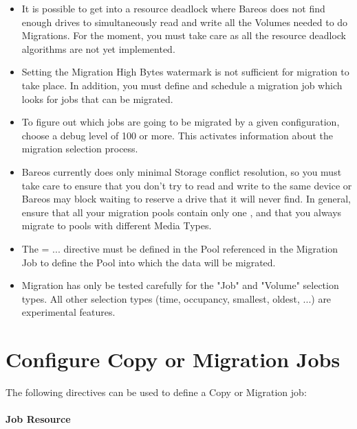 \begin{itemize}
\item It is possible to get into a resource deadlock where Bareos does
      not find enough drives to simultaneously read and write all the
      Volumes needed to do Migrations. For the moment, you must take
      care as all the resource deadlock algorithms are not yet implemented.

\item Setting the Migration High Bytes watermark is not sufficient
      for migration to take place. In addition, you must define
      and schedule a migration job which looks for jobs that can
      be migrated.

\item To figure out which jobs are going to be migrated by a given
      configuration, choose a debug level of 100 or more. This
      activates information about the migration selection process.

\item Bareos currently does only minimal Storage conflict resolution, so you
      must take care to ensure that you don't try to read and write to the
      same device or Bareos may block waiting to reserve a drive that it
      will never find. In general, ensure that all your migration
      pools contain only one ,
      and that you always
      migrate to pools with different Media Types.

\item The  = ... directive must be defined in the Pool
     referenced in the Migration Job to define the Pool into which the
     data will be migrated.

\item Migration has only be tested carefully for the "Job" and "Volume"
      selection types. All other selection types (time, occupancy,
      smallest, oldest, ...) are experimental features.

\end{itemize}

\section{Configure Copy or Migration Jobs}

The following directives can be used to define a Copy or Migration job:

\paragraph{Job Resource}

